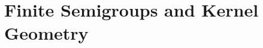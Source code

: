 \chapter{Finite Semigroups and Kernel Geometry}
\label{organized:semigroups}
\label{chaptertwo}






